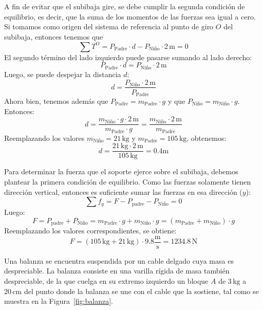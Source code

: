 \documentclass[addpoints]{exam}
\begin{document}
\begin{questions}
    \begin{solution}
    A fin de evitar que el subibaja gire, se debe cumplir la segunda condición de equilibrio, es decir, que la suma de los momentos de las fuerzas sea igual a cero. Si tomamos como origen del sistema de referencia al punto de giro \( O \) del subibaja, entonces tenemos que $$ \sum T^{O} = P_\text{Padre} \cdot d - P_\text{Niño} \cdot 2 \, \text{m} = 0 $$ El segundo término del lado izquierdo puede pasarse sumando al lado derecho: $$ P_\text{Padre} \cdot d = P_\text{Niño} \cdot 2 \, \text{m} $$ Luego, se puede despejar la distancia \( d \): $$ d = \frac{P_\text{Niño} \cdot 2 \, \text{m}}{P_\text{Padre}}$$ Ahora bien, tenemos además que \( P_\text{Padre} = m_\text{Padre} \cdot g \) y que \( P_\text{Niño} = m_\text{Niño} \cdot g \). Entonces: $$d = \frac{m_\text{Niño} \cdot g \cdot 2 \, \text{m}}{m_\text{Padre} \cdot g} = \frac{m_\text{Niño} \cdot 2 \, \text{m}}{m_\text{Padre}} $$ Reemplazando los valores \( m_\text{Niño} = 21 \, \text{kg} \) y \( m_\text{Padre} = 105 \, \text{kg} \), obtenemos: $$d = \frac{21 \, \text{kg} \cdot 2 \, \text{m}}{105 \, \text{kg}} = 0.4 \text{m} $$

    Para determinar la fuerza que el soporte ejerce sobre el subibaja, debemos plantear la primera condición de equilibrio. Como las fuerzas solamente tienen dirección vertical, entonces es suficiente sumar las fuerzas en esa dirección (\( y \)): $$ \sum f_y = F - P_\text{padre} - P_\text{Niño} = 0$$ Luego: $$F = P_\text{padre} + P_\text{Niño} = m_\text{Padre} \cdot g + m_\text{Niño} \cdot g  = \left(m_\text{Padre} + m_\text{Niño}\right) \cdot g $$ Reemplazando los valores correspondientes, se obtiene: $$F = \left( 105 \, \text{kg} + 21 \, \text{kg}\right) \cdot 9.8 \frac{\text{m}}{\text{s}} = 1234.8 \, \text{N} $$
    \end{solution}

    \question Una balanza se encuentra suspendida por un cable delgado cuya masa es despreciable. La balanza consiste en una varilla rígida de masa también despreciable, de la que cuelga en su extremo izquierdo un bloque \( A \) de \( 3 \, \text{kg} \) a  \( 20 \, \text{cm} \) del punto donde la balanza se une con el cable que la sostiene, tal como se muestra en la Figura~\ref{fig:balanza}. 

\end{questions}
\end{document}
